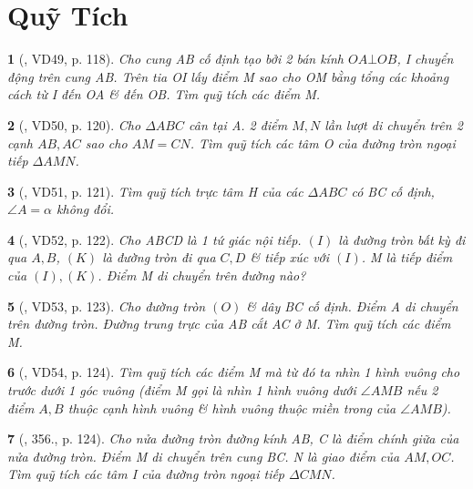\documentclass{article}
\newtheorem{baitoan}{}
\begin{document}
\section{Quỹ Tích}

\begin{baitoan}[\cite{Binh_Toan_9_tap_2}, VD49, p. 118]
	Cho cung AB cố định tạo bởi 2 bán kính $OA\bot OB$, I chuyển động trên cung AB. Trên tia OI lấy điểm M sao cho OM bằng tổng các khoảng cách từ I đến OA \& đến OB. Tìm quỹ tích các điểm M.
\end{baitoan}

\begin{baitoan}[\cite{Binh_Toan_9_tap_2}, VD50, p. 120]
	Cho $\Delta ABC$ cân tại A. 2 điểm $M,N$ lần lượt di chuyển trên 2 cạnh $AB,AC$ sao cho $AM = CN$. Tìm quỹ tích các tâm O của đường tròn ngoại tiếp $\Delta AMN$.
\end{baitoan}

\begin{baitoan}[\cite{Binh_Toan_9_tap_2}, VD51, p. 121]
	Tìm quỹ tích trực tâm H của các $\Delta ABC$ có BC cố định, $\angle{A} = \alpha$ không đổi.
\end{baitoan}

\begin{baitoan}[\cite{Binh_Toan_9_tap_2}, VD52, p. 122]
	Cho ABCD là 1 tứ giác nội tiếp. $(I)$ là đường tròn bất kỳ đi qua $A,B$, $(K)$ là đường tròn đi qua $C,D$ \& tiếp xúc với $(I)$. M là tiếp điểm của $(I),(K)$. Điểm M di chuyển trên đường nào?
\end{baitoan}

\begin{baitoan}[\cite{Binh_Toan_9_tap_2}, VD53, p. 123]
	Cho đường tròn $(O)$ \& dây BC cố định. Điểm A di chuyển trên đường tròn. Đường trung trực của AB cắt AC ở M. Tìm quỹ tích các điểm M.
\end{baitoan}

\begin{baitoan}[\cite{Binh_Toan_9_tap_2}, VD54, p. 124]
	Tìm quỹ tích các điểm M mà từ đó ta nhìn 1 hình vuông cho trước dưới 1 góc vuông (điểm M gọi là {\rm nhìn 1 hình vuông dưới $\angle{AMB}$} nếu 2 điểm $A,B$ thuộc cạnh hình vuông \& hình vuông thuộc miền trong của $\angle{AMB}$).
\end{baitoan}

\begin{baitoan}[\cite{Binh_Toan_9_tap_2}, 356., p. 124]
	Cho nửa đường tròn đường kính AB, C là điểm chính giữa của nửa đường tròn. Điểm M di chuyển trên cung BC. N là giao điểm của $AM,OC$. Tìm quỹ tích các tâm I của đường tròn ngoại tiếp $\Delta CMN$.
\end{baitoan}
\end{document}
